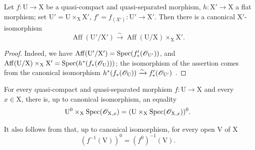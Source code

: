 \begin{proposition}[21.12.2]
\label{IV.21.12.2}
Let $f:\mathrm{U}\to\mathrm{X}$ be a quasi-compact and quasi-separated morphism, $h:\mathrm{X}'\to\mathrm{X}$ a \textup{flat} morphism; set $\mathrm{U}'=\mathrm{U}\times_{\mathrm{X}}\mathrm{X}'$, $f'=f_{(X')}:\mathrm{U}'\to\mathrm{X}'$.
Then there is a canonical $\mathrm{X}'$-isomorphism
\[
\label{IV.21.12.2.1}
  \operatorname{Aff}(\mathrm{U}'/\mathrm{X}')\xrightarrow{\sim}\operatorname{Aff}(\mathrm{U}/\mathrm{X})\times_{\mathrm{X}}\mathrm{X}'.
  \tag{21.12.2.1}
\]
\end{proposition}

\begin{proof}
Indeed, we have $\operatorname{Aff}(\mathrm{U}'/\mathrm{X}')=\operatorname{Spec}(f'_*(\mathscr{O}_{\mathrm{U}'}))$, and $\operatorname{Aff}(\mathrm{U}/\mathrm{X})\times_{\mathrm{X}}\mathrm{X}'=\operatorname{Spec}(h^*(f_*(\mathscr{O}_{\mathrm{U}})))$; the isomorphism of the assertion comes from the canonical isomorphism $h^*(f_*(\mathscr{O}_{\mathrm{U}}))\xrightarrow{\sim}f'_*(\mathscr{O}_{\mathrm{U}'})$ .
\end{proof}

\begin{corollary}[21.12.3]
\label{IV.21.12.3}
For every quasi-compact and quasi-separated morphism $f:\mathrm{U}\to\mathrm{X}$ and every $x\in\mathrm{X}$, there is, up to canonical isomorphism, an equality
\[
  \mathrm{U}^0\times_{\mathrm{X}}\operatorname{Spec}(\mathscr{O}_{\mathrm{X},x})=(\mathrm{U}\times_{\mathrm{X}}\operatorname{Spec}(\mathscr{O}_{\mathrm{X},x}))^0.
\]
\end{corollary}

It also follows from  that, up to canonical isomorphism, for every open $\mathrm{V}$ of $\mathrm{X}$
\[
\label{IV.21.12.4}
  (f^{-1}(\mathrm{V}))^0=(f^0)^{-1}(\mathrm{V}).
  \tag{21.12.4}
\]

